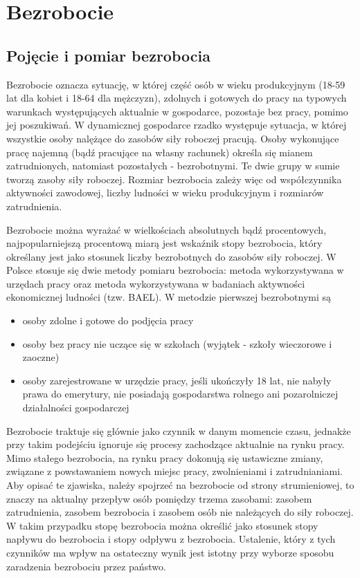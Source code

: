 \documentclass[12pt]{extarticle}
\begin{document}
\section{Bezrobocie}

\subsection{Pojęcie i pomiar bezrobocia}

Bezrobocie oznacza sytuację, w której część osób w wieku produkcyjnym (18-59 lat dla kobiet i 18-64 dla mężczyzn), zdolnych i gotowych do pracy na typowych warunkach występujących aktualnie w gospodarce, pozostaje bez pracy, pomimo jej poszukiwań. W dynamicznej gospodarce rzadko występuje sytuacja, w której wszystkie osoby nalężące do zasobów siły roboczej pracują. Osoby wykonujące pracę najemną (bądź pracujące na własny rachunek) określa się mianem zatrudnionych, natomiast pozostałych - bezrobotnymi. Te dwie grupy w sumie tworzą zasoby siły roboczej. Rozmiar bezrobocia zależy więc od współczynnika aktywności zawodowej, liczby ludności w wieku produkcyjnym i rozmiarów zatrudnienia.

Bezrobocie można wyrażać w wielkościach absolutnych bądź procentowych, najpopularniejszą procentową miarą jest wskaźnik stopy bezrobocia, który określany jest jako stosunek liczby bezrobotnych do zasobów siły roboczej. W Polsce stosuje się dwie metody pomiaru bezrobocia: metoda wykorzystywana w urzędach pracy oraz metoda wykorzystywana w badaniach aktywności ekonomicznej ludności (tzw. BAEL). W metodzie pierwszej bezrobotnymi są

\begin{itemize}
	\item osoby zdolne i gotowe do podjęcia pracy
    \item osoby bez pracy nie uczące się w szkołach (wyjątek - szkoły wieczorowe i zaoczne)
	\item osoby zarejestrowane w urzędzie pracy, jeśli ukończyły 18 lat, nie nabyły prawa do emerytury, nie posiadają gospodarstwa rolnego ani pozarolniczej działalności gospodarczej
\end{itemize}

Bezrobocie traktuje się głównie jako czynnik w danym momencie czasu, jednakże przy takim podejściu ignoruje się procesy zachodzące aktualnie na rynku pracy. Mimo stałego bezrobocia, na rynku pracy dokonują się ustawiczne zmiany, związane z powstawaniem nowych miejsc pracy, zwolnieniami i zatrudnianiami. Aby opisać te zjawiska, należy spojrzeć na bezrobocie od strony strumieniowej, to znaczy na aktualny przepływ osób pomiędzy trzema zasobami: zasobem zatrudnienia, zasobem bezrobocia i zasobem osób nie należących do siły roboczej. W takim przypadku stopę bezrobocia można określić jako stosunek stopy napływu do bezrobocia i stopy odpływu z bezrobocia. Ustalenie, który z tych czynników ma wpływ na ostateczny wynik jest istotny przy wyborze sposobu zaradzenia bezrobociu przez państwo.
\end{document}

